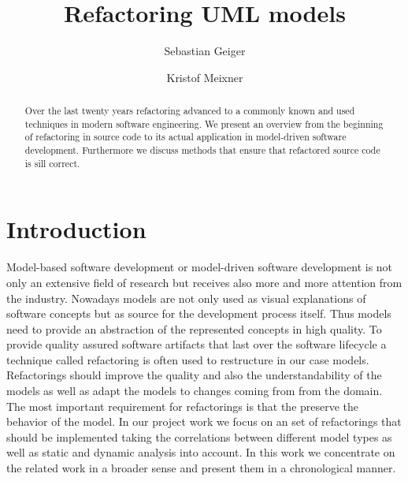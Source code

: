 \documentclass{llncs}
\begin{document}
\pagestyle{plain}

\title{Refactoring UML models}
\author{Sebastian Geiger \and Kristof Meixner}

\maketitle

\begin{abstract}
Over the last twenty years refactoring advanced to a commonly known and used techniques in modern software engineering. We present an overview from the beginning of refactoring in source code to its actual application in model-driven software development. Furthermore we discuss methods that ensure that refactored source code is sill correct.
\end{abstract}

\tableofcontents
\newpage


\section{Introduction}
\label{sec:intro}

Model-based software development or model-driven software development is not only an extensive field of research but receives also more and more attention from the industry. Nowadays models are not only used as visual explanations of software concepts but as source for the development process itself. Thus models need to provide an abstraction of
the represented concepts in high quality. To provide quality assured software artifacts that last over the software lifecycle a technique called refactoring is often used to restructure in our case models. Refactorings should improve the quality and also the understandability of the models as well as adapt the models to changes coming from from the domain. The most important requirement for refactorings is that the preserve the behavior of the model. In our project work we focus on an set of refactorings that should be implemented taking the correlations between different model types as well as static and dynamic analysis into account. In this work we concentrate on the related work in a broader sense and present them in a chronological manner.
\end{document}
